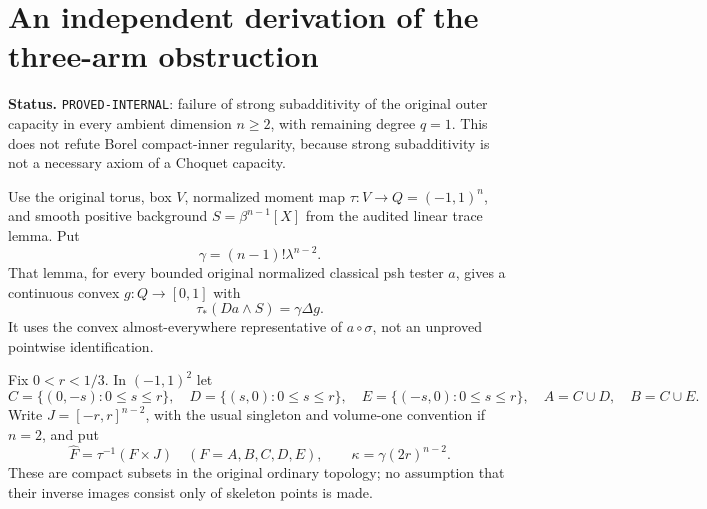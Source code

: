 \section{An independent derivation of the three-arm obstruction}
\noindent\textbf{Status.} \texttt{PROVED-INTERNAL}: failure of strong subadditivity of the original outer capacity in every ambient dimension $n\ge2$, with remaining degree $q=1$. This does not refute Borel compact-inner regularity, because strong subadditivity is not a necessary axiom of a Choquet capacity.

Use the original torus, box $V$, normalized moment map $\tau:V\to Q=(-1,1)^n$, and smooth positive background $S=\beta^{n-1}[X]$ from the audited linear trace lemma. Put
\[
 \gamma=(n-1)!\lambda^{n-2}.
\]
That lemma, for every bounded original normalized classical psh tester $a$, gives a continuous convex $g:Q\to[0,1]$ with
\[
 \tau_*(Da\wedge S)=\gamma\Delta g.
 \tag{SA1}
\]
It uses the convex almost-everywhere representative of $a\circ\sigma$, not an unproved pointwise identification.

Fix $0<r<1/3$. In $(-1,1)^2$ let
\[
 C=\{(0,-s):0\le s\le r\},\quad
 D=\{(s,0):0\le s\le r\},\quad
 E=\{(-s,0):0\le s\le r\},\quad
 A=C\cup D,\quad B=C\cup E.
\]
Write $J=[-r,r]^{n-2}$, with the usual singleton and volume-one convention if $n=2$, and put
\[
 \widehat F=\tau^{-1}(F\times J)\quad(F=A,B,C,D,E),\qquad
 \kappa=\gamma(2r)^{n-2}.
\]
These are compact subsets in the original ordinary topology; no assumption that their inverse images consist only of skeleton points is made.


